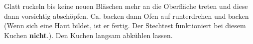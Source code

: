 Glatt ruckeln bis keine neuen Bläschen mehr an die Oberfläche treten und diese dann vorsichtig abschöpfen.
Ca.  backen dann Ofen auf  runterdrehen und  backen (Wenn sich eine Haut bildet, ist er fertig.
Der Stechtest funktioniert bei diesem Kuchen \textbf{nicht}.). Den Kuchen langsam abkühlen lassen.